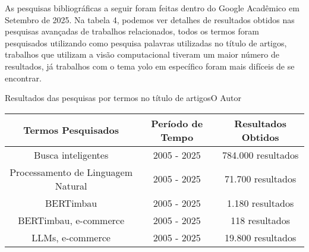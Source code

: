 As pesquisas bibliográficas a seguir foram feitas dentro do Google Acadêmico em Setembro de 2025. Na tabela 4, podemos ver detalhes de resultados obtidos nas pesquisas avançadas de trabalhos relacionados, 
todos os termos foram pesquisados utilizando como pesquisa palavras utilizadas no título de artigos, trabalhos que utilizam a visão computacional tiveram um maior número de resultados, já trabalhos com o tema \ac{yolo} em específico foram mais difíceis de se encontrar.

\begin{tabela}{Resultados das pesquisas por termos no título de artigos}{O Autor}
\label{tab:resultados-pesquisa}
\begin{tabular}{|c|c|c|}
\hline
\textbf{Termos Pesquisados} & \textbf{Período de Tempo} & \textbf{Resultados Obtidos} \\
\hline
Busca inteligentes & 2005 - 2025 & 784.000 resultados \\
Processamento de Linguagem Natural       & 2005 - 2025 & 71.700 resultados  \\
BERTimbau                      & 2005 - 2025 & 1.180 resultados \\
BERTimbau, e-commerce                      & 2005 - 2025 & 118 resultados \\
LLMs, e-commerce        & 2005 - 2025 & 19.800 resultados \\
\hline
\end{tabular}
\end{tabela}
\vspace{0.5cm}



